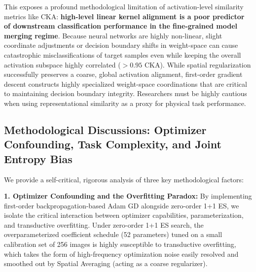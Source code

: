 This exposes a profound methodological limitation of activation-level similarity metrics like CKA: \textbf{high-level linear kernel alignment is a poor predictor of downstream classification performance in the fine-grained model merging regime}. Because neural networks are highly non-linear, slight coordinate adjustments or decision boundary shifts in weight-space can cause catastrophic misclassifications of target samples even while keeping the overall activation subspace highly correlated ($>0.95$ CKA). While spatial regularization successfully preserves a coarse, global activation alignment, first-order gradient descent constructs highly specialized weight-space coordinations that are critical to maintaining decision boundary integrity. Researchers must be highly cautious when using representational similarity as a proxy for physical task performance.

\subsection{Methodological Discussions: Optimizer Confounding, Task Complexity, and Joint Entropy Bias}

We provide a self-critical, rigorous analysis of three key methodological factors:

\textbf{1. Optimizer Confounding and the Overfitting Paradox:}
By implementing first-order backpropagation-based Adam GD alongside zero-order 1+1 ES, we isolate the critical interaction between optimizer capabilities, parameterization, and transductive overfitting. Under zero-order 1+1 ES search, the overparameterized coefficient schedule (52 parameters) tuned on a small calibration set of 256 images is highly susceptible to transductive overfitting, which takes the form of high-frequency optimization noise easily resolved and smoothed out by Spatial Averaging (acting as a coarse regularizer). 

